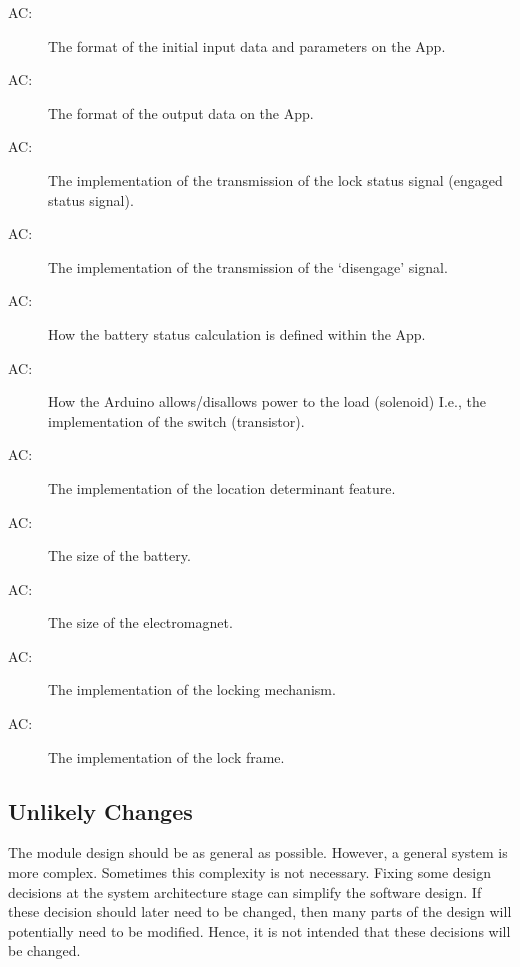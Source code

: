 \documentclass[12pt, titlepage]{article}
\newcounter{acnum}
\newcommand{\actheacnum}{AC\theacnum}
\begin{document}
\begin{description}
\item[\actheacnum\label{acInput}:] The format of the initial input data and parameters on the App. 
\item[\actheacnum\label{acOutput}:] The format of the output data on the App. 
\item[\actheacnum\label{acEngage}:] The implementation of the transmission of the lock status signal (engaged status signal). 
\item[\actheacnum\label{acWireless}:] The implementation of the transmission of the ‘disengage’ signal. 
\item[\actheacnum\label{acBatteryStatus}:] How the battery status calculation is defined within the App. 
\item[\actheacnum\label{acPowerSignal}:] How the Arduino allows/disallows power to the load (solenoid) I.e., the implementation of the switch (transistor). 
\item[\actheacnum\label{acGeocaching}:] The implementation of the location determinant feature. 
\item[\actheacnum\label{acBattery}:] The size of the battery. 
\item[\actheacnum\label{acMagnet}:] The size of the electromagnet. 
\item[\actheacnum\label{acLockingMechanism}:] The implementation of the locking mechanism. 
\item[\actheacnum\label{acLockFrame}:] The implementation of the lock frame. 

\end{description}

\subsection{Unlikely Changes} \label{SecUchange}

The module design should be as general as possible. However, a general system is
more complex. Sometimes this complexity is not necessary. Fixing some design
decisions at the system architecture stage can simplify the software design. If
these decision should later need to be changed, then many parts of the design
will potentially need to be modified. Hence, it is not intended that these
decisions will be changed.
\end{document}
